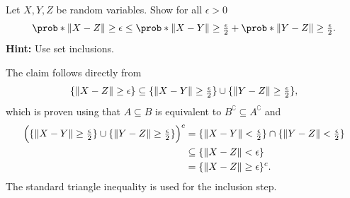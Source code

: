 \begin{exercise}
    \label{ex: stochastic triangle}
    Let \(X,Y,Z\) be random variables. Show for all \(\epsilon > 0\)
    \[
        \prob*{\norm{X - Z} \ge \epsilon} \le \prob*{\norm{X - Y} \ge \tfrac\epsilon2} + \prob*{\norm{Y - Z} \ge \tfrac\epsilon2}.
    \] 
    \textbf{Hint:} Use set inclusions.
    \begin{solution}
        The claim follows directly from
        \[
            \{\lVert X - Z\rVert \ge \epsilon\}
            \subseteq \{\lVert X - Y\rVert \ge \tfrac\epsilon2\} \cup \{\lVert Y - Z\rVert \ge \tfrac\epsilon2\},
        \]
        which is proven using that \(A \subseteq B\) is equivalent
        to \(B^\complement \subseteq A^\complement\) and
        \begin{align*}
            \Bigl(\{\lVert X - Y\rVert \ge \tfrac\epsilon2\} \cup \{\lVert Y - Z\rVert \ge \tfrac\epsilon2\}\Bigr)^c
            &=\{\lVert X - Y\rVert < \tfrac\epsilon2\} \cap \{\lVert Y - Z\rVert < \tfrac\epsilon2\}
            \\
            &\subseteq \{\lVert X - Z\rVert < \epsilon\}
            \\
            &= \{\lVert X - Z\rVert \ge \epsilon\}^c.
        \end{align*}
        The standard triangle inequality is used for the inclusion step.
    \end{solution}
\end{exercise}


